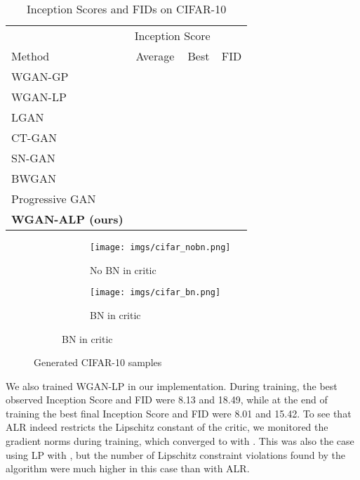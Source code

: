 \documentclass{article}
\begin{document}
\begin{table}[h]
  \caption{Inception Scores and FIDs on CIFAR-10}
  \label{inception_scores}
  \centering
  \begin{tabular}{lccc}
    \toprule
    &\multicolumn{2}{c}{Inception Score}&\\
    \cmidrule(r){2-3}
    Method & Average & Best & FID\\
    \midrule
    WGAN-GP             &  &        &  \\
    WGAN-LP             &  &        &                 \\
    LGAN                &  &        &  \\
    CT-GAN              &  &        &                 \\
    SN-GAN              &  &        &  \\
    BWGAN               &  &        &          \\
    Progressive GAN     &  &  &                 \\
    \textbf{WGAN-ALP (ours)} &  &  &   \\
    \bottomrule
  \end{tabular}
\end{table}

\begin{figure}[h]
\begin{subfigure}{\linewidth}
  \centering
  \begin{subfigure}{.495\linewidth}
  \texttt{[image: imgs/cifar\_nobn.png]}
  \caption{No BN in critic}
  \label{cifar_samples_nobn}
  \end{subfigure}\hfill
  \begin{subfigure}{.495\linewidth}
  \texttt{[image: imgs/cifar\_bn.png]}
  \caption{BN in critic}
  \label{cifar_samples_bn}
  \end{subfigure}
\end{subfigure}
  \caption{Generated CIFAR-10 samples}
  \label{cifar_samples}
\end{figure}

We also trained WGAN-LP in our implementation. During training, the best observed Inception Score and FID were 8.13 and 18.49, while at the end of training the best final Inception Score and FID were 8.01 and 15.42. To see that ALR indeed restricts the Lipschitz constant of the critic, we monitored the gradient norms during training, which converged to  with . This was also the case using LP with , but the number of Lipschitz constraint violations found by the algorithm were much higher in this case than with ALR.
\end{document}
